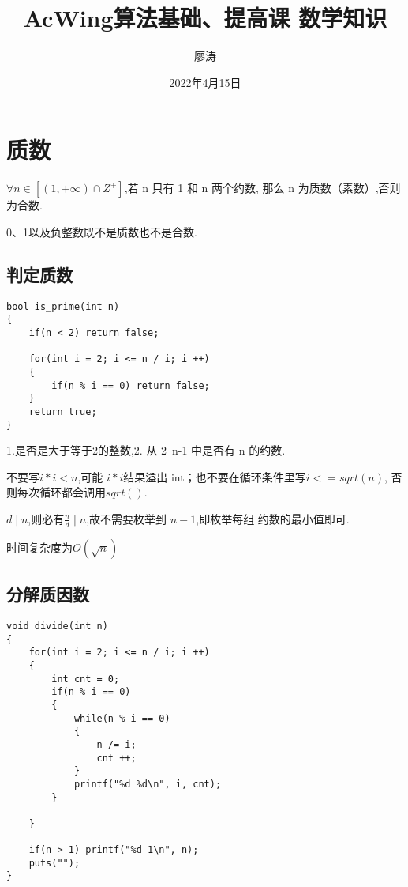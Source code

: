 \documentclass[]{book}
\title{AcWing算法基础、提高课 数学知识}
\author{廖涛}
\date{2022年4月15日}
\begin{document}


\maketitle
\tableofcontents

\chapter{质数}
$\forall n\in [(1, +\infty) \cap Z^+]$,若 n 只有 1 和 n 两个约数,
那么 n 为质数（素数）,否则为合数.

0、1以及负整数既不是质数也不是合数.

\section{判定质数}
\begin{lstlisting}
bool is_prime(int n)
{
    if(n < 2) return false;

    for(int i = 2; i <= n / i; i ++)
    {
        if(n % i == 0) return false;
    }
    return true;
}
\end{lstlisting}

1.是否是大于等于2的整数,2. 从 2~n-1 中是否有 n 的约数.

不要写$i*i<n$,可能 $i*i$结果溢出 int；也不要在循环条件里写$i<=sqrt(n)$,
否则每次循环都会调用$sqrt()$.

$d \mid n$,则必有$\frac{n}{d} \mid n$,故不需要枚举到 $n - 1$,即枚举每组
约数的最小值即可.

时间复杂度为$O(\sqrt{n})$

\section{分解质因数}
\begin{lstlisting}
void divide(int n)
{
    for(int i = 2; i <= n / i; i ++)
    {   
        int cnt = 0;
        if(n % i == 0)
        {
            while(n % i == 0)
            {
                n /= i;
                cnt ++;
            }
            printf("%d %d\n", i, cnt);
        }
        
    }
    
    if(n > 1) printf("%d 1\n", n);
    puts("");
}
\end{lstlisting}
\end{document}
